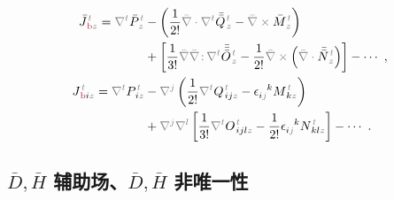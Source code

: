 \begin{subequations}
\begin{align}
\bar{J}^{\;\!\mathcolor{gray}{t}}_{\;\!\textcolor{Maroon}{\text{b}}\mathcolor{gray}{z}} = \mathcolor{gray}{\nabla^t} \bar{P}^{\;\!\mathcolor{gray}{t}}_{\;\!\mathcolor{gray}{z}} &- \left( \frac{1}{2!} \mathcolor{gray}{\bar{\nabla} \cdot} \mathcolor{gray}{\nabla^t} \bar{\bar{Q}}^{\;\!\mathcolor{gray}{t}}_{\;\!\mathcolor{gray}{z}} - \mathcolor{gray}{\bar{\nabla} \times} \bar{M}^{\;\!\mathcolor{gray}{t}}_{\;\!\mathcolor{gray}{z}} \right) \label{eq:J-b} \\ &+ \left[ \frac{1}{3!} \mathcolor{gray}{\bar{\nabla}} \mathcolor{gray}{\bar{\nabla} \colon}\! \mathcolor{gray}{\nabla^t} \bar{\bar{\bar{O}}}^{\;\!\mathcolor{gray}{t}}_{\;\!\mathcolor{gray}{z}} - \frac{1}{2!} \mathcolor{gray}{\bar{\nabla} \times} \left( \mathcolor{gray}{\bar{\nabla} \cdot}  \bar{\bar{N}}^{\;\!\mathcolor{gray}{t}}_{\;\!\mathcolor{gray}{z}} \right) \right] - \cdots~, \\
J^{\;\!\mathcolor{gray}{t}}_{\;\!\textcolor{Maroon}{\text{b}} i \mathcolor{gray}{z}} = \mathcolor{gray}{\nabla^t} P^{\;\!\mathcolor{gray}{t}}_{\;\! i\mathcolor{gray}{z}} &- \mathcolor{gray}{\nabla^j} \left( \frac{1}{2!} \mathcolor{gray}{\nabla^t} Q^{\;\!\mathcolor{gray}{t}}_{\;\! ij\mathcolor{gray}{z}} - \epsilon^{\hphantom{ij}k}_{i\mathcolor{gray}{j}} M^{\;\!\mathcolor{gray}{t}}_{\;\! k\mathcolor{gray}{z}} \right) \label{eq:j-b} \\ &+ \mathcolor{gray}{\nabla^j} \mathcolor{gray}{\nabla^l} \left[ \frac{1}{3!}  \mathcolor{gray}{\nabla^t} O^{\;\!\mathcolor{gray}{t}}_{\;\! ijl\mathcolor{gray}{z}} - \frac{1}{2!} \epsilon^{\hphantom{ij}k}_{i\mathcolor{gray}{j}} N^{\;\!\mathcolor{gray}{t}}_{\;\! kl\mathcolor{gray}{z}} \right] - \cdots~.
\end{align}
\end{subequations}

\clearpage
\vspace*{-7.5em}

\subsection{$\bar{D},\bar{H}$ 辅助场、$\bar{D},\bar{H}$ 非唯一性}\label{ssec:DH}

